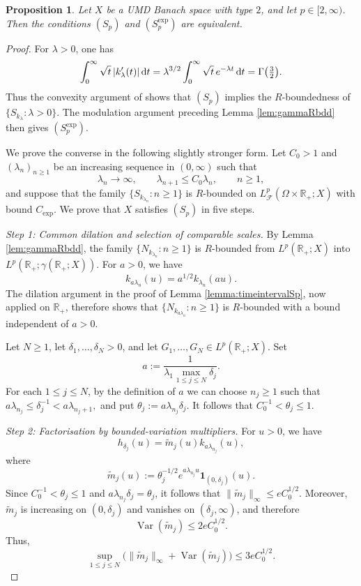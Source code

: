\documentclass{amsart}
\let\leq\leqslant
\let\geq\geqslant
\theoremstyle{plain}
\theoremstyle{remark}
\theoremstyle{plain}
\newtheorem{proposition}[theorem]{Proposition}
\numberwithin{equation}{section}
\newcommand{\R}{\mathbb R}
\newcommand{\1}{\mathbf 1}
\newcommand{\dd}{\,{\rm d}}
\begin{document}
\begin{proposition}\label{prop:HpEp}
Let $X$ be a UMD Banach space with type $2$, and let $p\in  [2, \infty)$. Then the conditions
$(S_p)$ and $(S_p^{\exp})$ are equivalent.
\end{proposition}

\begin{proof}
For $\lambda>0$, one has
\[
        \int_0^\infty \sqrt{t}\,|k_\lambda'(t)|\dd t
        =\lambda^{3/2}\int_0^\infty \sqrt{t}\,e^{-\lambda t}\dd t
        =\Gamma\big(\tfrac32\big).
\]
Thus the convexity argument of \cite[Proposition 3.2]{NVW-SMR} shows that $(S_p)$ implies the $R$-boundedness of $\{S_{k_\lambda}:\lambda>0\}$. The modulation argument preceding Lemma \ref{lem:gammaRbdd} then gives $(S_p^{\exp})$.

We prove the converse in the following slightly stronger form. Let $C_0> 1$ and
$(\lambda_n)_{n\geq1}$ be an increasing sequence in $(0,\infty)$ such that
\[
     \lambda_n \to \infty,\qquad    \lambda_{n+1}\leq C_0\lambda_n,
        \qquad n\geq1,
\]
and suppose that the family $\{S_{k_{\lambda_n}}:n\geq1\}$ is $R$-bounded on
$L^p_{\mathscr F}(\Omega\times\R_+;X)$ with bound $C_{\exp}$. We prove that $X$ satisfies $(S_p)$ in five steps.

\smallskip
\emph{Step 1: Common dilation and selection of comparable scales.}
By Lemma \ref{lem:gammaRbdd}, the family $\{N_{k_{\lambda_n}}:n\geq1\}$
is $R$-bounded from $L^p(\R_+;X)$ into
$L^p(\R_+;\gamma(\R_+;X))$. For $a>0$, we have
\[
        k_{a\lambda_n}(u)=a^{1/2}k_{\lambda_n}(au).
\]
The dilation argument in the proof of Lemma \ref{lemma:timeintervalSp}, now applied on $\R_+$, therefore shows that
$\{N_{k_{a\lambda_n}}:n\geq1\}$ is $R$-bounded with a bound independent of $a>0$.

Let $N\geq1$, let $\delta_1,\ldots,\delta_N>0$, and let
$G_1,\ldots,G_N\in L^p(\R_+;X)$. Set
\[
        a:=\frac{1}{\lambda_1\max_{1\leq j\leq N}\delta_j}.
\]
For each $1\leq j\leq N$, by the definition of $a$ we can choose $n_j\geq1$ such that
$a\lambda_{n_j}\leq\delta_j^{-1}       <a\lambda_{n_j+1},$
and put
\(\theta_j:=a\lambda_{n_j}\delta_j.\)
It follows that $C_0^{-1}<\theta_j\leq1.$

\smallskip
\emph{Step 2: Factorisation by bounded-variation multipliers.}
For $u>0$, we have
\[
        h_{\delta_j}(u)=\widetilde m_j(u)k_{a\lambda_{n_j}}(u),
\]
where
\[
        \widetilde m_j(u)
        :=\theta_j^{-1/2}e^{a\lambda_{n_j} u}\1_{(0,\delta_j)}(u).
\]
Since $C_0^{-1}<\theta_j\leq1$ and
$a\lambda_{n_j}\delta_j=\theta_j$, it follows that
$\|\widetilde m_j\|_\infty\leq eC_0^{1/2}$. Moreover,
$\widetilde m_j$ is increasing on $(0,\delta_j)$ and vanishes on
$(\delta_j,\infty)$, and therefore
\[
        \operatorname{Var}(\widetilde m_j)
        \leq2eC_0^{1/2}.
\]
Thus, 
\begin{equation}\label{eq:varestequiv}
        \sup_{1\leq j\leq N}
        \bigl(
        \|\widetilde m_j\|_\infty
        +\operatorname{Var}(\widetilde m_j)
        \bigr)
        \leq3eC_0^{1/2}.
\end{equation}


\end{proof}
\end{document}
